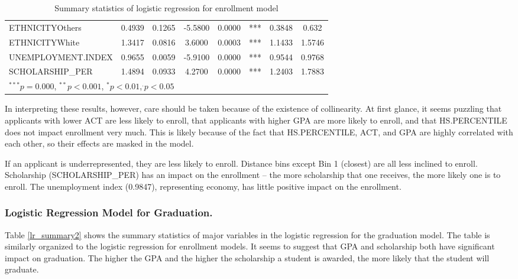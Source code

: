 \documentclass[12pt,english]{report}
\begin{document}
\begin{table}[h]
\begin{adjustbox}{width=0.95\textwidth}
\begin{tabular}{|lccclccc|}
ETHNICITYOthers                & 0.4939   & 0.1265     & -5.5800  & 0.0000    & ***         & 0.3848 & 0.632   \\
ETHNICITYWhite                  & 1.3417   & 0.0816     & 3.6000   & 0.0003    & ***         & 1.1433 & 1.5746  \\
UNEMPLOYMENT.INDEX              & 0.9655   & 0.0059     & -5.9100  & 0.0000    & ***         & 0.9544 & 0.9768  \\
SCHOLARSHIP\_PER                & 1.4894   & 0.0933     & 4.2700   & 0.0000    & ***         & 1.2403 & 1.7883  \\
\hline %
\multicolumn{7}{l}{\scriptsize{$^{***} p=0.000$, $^{**} p<0.001$, $^*p<0.01$,$^{.}p<0.05$}}
\end{tabular}
\end{adjustbox}
\caption{Summary statistics of logistic regression for enrollment model}
\label{lr_summary}
\end{table}

In interpreting these results, however, care should be taken because of the existence of collinearity. At first glance, it seems puzzling that  applicants with lower ACT are less likely to enroll, that applicants with higher GPA are more likely to enroll, and that HS.PERCENTILE does not impact enrollment very much. This is likely because of the fact that HS.PERCENTILE, ACT, and GPA are highly correlated with each other, so their effects are masked in the model. 

If an applicant is underrepresented, they are  less likely to enroll. Distance bins except Bin 1 (closest) are all less inclined to  enroll. Scholarship (SCHOLARSHIP\_PER) has an impact on the  enrollment -- the more scholarship that one receives, the more likely one is to enroll.  The unemployment index (0.9847), representing economy, has  little positive impact on the enrollment.
  
\subsubsection{Logistic Regression Model for Graduation.}  
Table \ref{lr_summary2} shows the summary statistics of major variables in the logistic regression for the graduation model. The table is similarly organized to the logistic regression for enrollment models.  It seems to suggest that  GPA and scholarship both have significant impact on  graduation. The higher the GPA and the higher the scholarship a student is awarded, the more likely that the student will graduate. 
\end{document}
